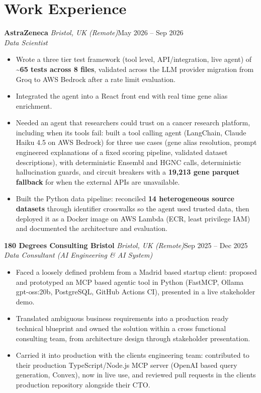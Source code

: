 \documentclass[a4paper,11pt]{article}
\newcommand{\role}[4]{%
  \textbf{#1}{\color{muted}\,\textperiodcentered\,\textit{#2}}\hfill{\color{muted}#3}\\
  \textit{#4}\par}
\newcommand{\gap}{\vspace{5pt}}
\newcommand{\num}[1]{\textbf{#1}}   %
\begin{document}
\section{Work Experience}
\role{AstraZeneca}{Bristol, UK (Remote)}{May 2026 – Sep 2026}{Data Scientist}
\begin{itemize}
  \item Wrote a three tier test framework (tool level, API/integration, live agent) of \num{\textasciitilde{}65 tests across 8 files}, validated across the LLM provider migration from Groq to AWS Bedrock after a rate limit evaluation.
  \item Integrated the agent into a React front end with real time gene alias enrichment.
  \item Needed an agent that researchers could trust on a cancer research platform, including when its tools fail: built a tool calling agent (LangChain, Claude Haiku 4.5 on AWS Bedrock) for three use cases (gene alias resolution, prompt engineered explanations of a fixed scoring pipeline, validated dataset descriptions), with deterministic Ensembl and HGNC calls, deterministic hallucination guards, and circuit breakers with a \num{19,213 gene parquet fallback} for when the external APIs are unavailable.
  \item Built the Python data pipeline: reconciled \num{14 heterogeneous source datasets} through identifier crosswalks so the agent used trusted data, then deployed it as a Docker image on AWS Lambda (ECR, least privilege IAM) and documented the architecture and evaluation.
\end{itemize}
\gap
{}
\role{180 Degrees Consulting Bristol}{Bristol, UK (Remote)}{Sep 2025 – Dec 2025}{Data Consultant (AI Engineering \& AI System)}
\begin{itemize}
  \item Faced a loosely defined problem from a Madrid based startup client: proposed and prototyped an MCP based agentic tool in Python (FastMCP, Ollama gpt-oss:20b, PostgreSQL, GitHub Actions CI), presented in a live stakeholder demo.
  \item Translated ambiguous business requirements into a production ready technical blueprint and owned the solution within a cross functional consulting team, from architecture design through stakeholder presentation.
  \item Carried it into production with the client\textquotesingle{}s engineering team: contributed to their production TypeScript/Node.js MCP server (OpenAI based query generation, Convex), now in live use, and reviewed pull requests in the client\textquotesingle{}s production repository alongside their CTO.
\end{itemize}
\end{document}
